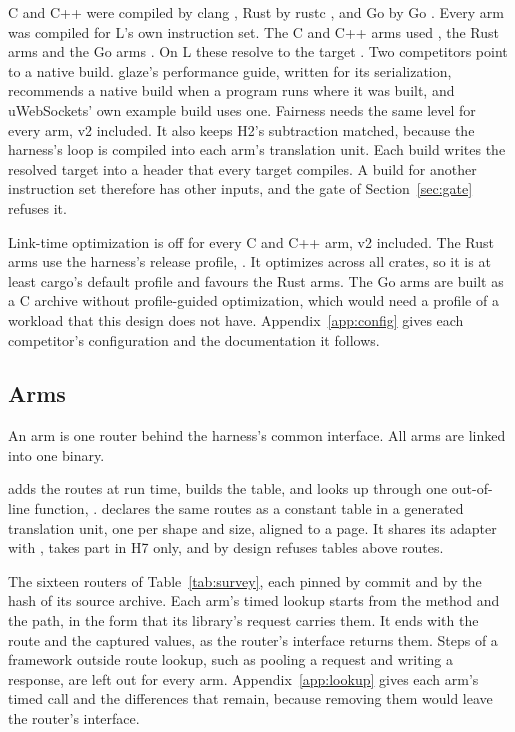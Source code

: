 C and C++ were compiled by clang \ClangVersion, Rust by rustc \RustcVersion, and Go by Go \GoVersion.
Every arm was compiled for L's own instruction set. The C and C++ arms used \FlagsCxx, the Rust arms
\FlagRust{} and the Go arms \FlagGo. On L these resolve to the target \TargetCpu. Two competitors
point to a native build. glaze's performance guide, written for its serialization, recommends a
native build when a program runs where it was built, and uWebSockets' own example build uses one.
Fairness needs the same level for every arm, v2 included. It also keeps H2's subtraction matched,
because the harness's loop is compiled into each arm's translation unit. Each build writes the
resolved target into a header that every target compiles. A build for another instruction set
therefore has other inputs, and the gate of Section~\ref{sec:gate} refuses it.

Link-time optimization is off for every C and C++ arm, v2 included. The Rust arms use the harness's
release profile, \RustProfile. It optimizes across all crates, so it is at least cargo's default
profile and favours the Rust arms. The Go arms are built as a C archive without
profile-guided optimization, which would need a profile of a workload that this design does not
have. Appendix~\ref{app:config} gives each competitor's configuration and the documentation it
follows.

\subsection{Arms}\label{sec:arms}

An arm is one router behind the harness's common interface. All arms are linked into one binary.

  adds the routes at run time, builds the table, and looks up
through one out-of-line function, \FindVtwo.  declares the same
routes as a constant table in a generated translation unit, one per shape and size, aligned to a
page. It shares its adapter with , takes part in H7 only, and by design refuses
tables above \SizeThousand{} routes.

 The sixteen routers of Table~\ref{tab:survey}, each pinned by commit and by
the hash of its source archive. Each arm's timed lookup starts from the method and the path, in the
form that its library's request carries them. It ends with the route and the captured values, as the
router's interface returns them. Steps of a framework outside route lookup, such as pooling a request and writing a
response, are left out for every arm. Appendix~\ref{app:lookup} gives each arm's timed call and the
differences that remain, because removing them would leave the router's interface.

